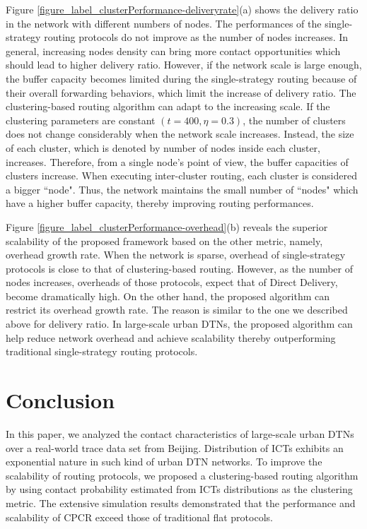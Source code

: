 \documentclass[conference]{IEEEtran}
\begin{document}
Figure \ref{figure_label_clusterPerformance-deliveryrate}(a) shows the delivery ratio in the network with different numbers of nodes. The performances of the single-strategy routing protocols do not improve as the number of nodes increases. In general, increasing nodes density can bring more contact opportunities which should lead to higher delivery ratio. However, if the network scale is large enough, the buffer capacity becomes limited during the single-strategy routing because of their overall forwarding behaviors, which limit the increase of delivery ratio. The clustering-based routing algorithm can adapt to the increasing scale. If the clustering parameters are constant $(t=400,\eta =0.3)$, the number of clusters does not change considerably when the network scale increases. Instead, the size of each cluster, which is denoted by number of nodes inside each cluster, increases. Therefore, from a single node's point of view, the buffer capacities of clusters increase. When executing inter-cluster routing, each cluster is considered a bigger ``node". Thus, the network maintains the small number of ``nodes" which have a higher buffer capacity, thereby improving routing performances.

Figure \ref{figure_label_clusterPerformance-overhead}(b) reveals the superior scalability of the proposed framework based on the other metric, namely, overhead growth rate. When the network is sparse, overhead of single-strategy protocols is close to that of clustering-based routing. However, as the number of nodes increases, overheads of those protocols, expect that of Direct Delivery, become dramatically high. On the other hand, the proposed algorithm can restrict its overhead growth rate. The reason is similar to the one we described above for delivery ratio. In large-scale urban DTNs, the proposed algorithm can help reduce network overhead and achieve scalability thereby outperforming traditional single-strategy routing protocols.

\section{Conclusion}
\label{Section6_conclusions}

In this paper, we analyzed the contact characteristics of large-scale urban DTNs over a real-world trace data set from Beijing.  Distribution of ICTs exhibits an exponential nature in such kind of urban DTN networks. To improve the scalability of routing protocols, we proposed a clustering-based routing algorithm by using contact probability estimated from ICTs distributions as the clustering metric. The extensive simulation results demonstrated that the performance and scalability of CPCR exceed those of traditional flat protocols. 
\end{document}
